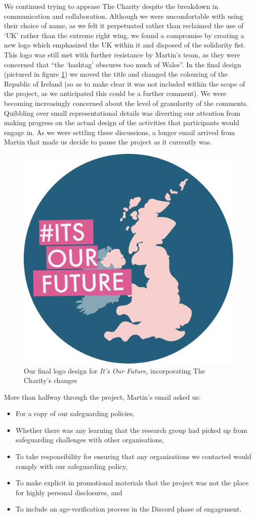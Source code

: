 We continued trying to appease The Charity despite the breakdown in communication and collaboration. Although we were uncomfortable with using their choice of name, as we felt it perpetuated rather than reclaimed the use of ‘UK’ rather than the extreme right wing, we found a compromise by creating a new logo which emphasized the UK within it and disposed of the solidarity fist.  This logo was still met with further resistance by Martin's team, as they were concerned that “the ‘hashtag’ obscures too much of Wales”. In the final design (pictured in figure \ref{fig:iof-logo-2}) we moved the title and changed the colouring of the Republic of Ireland (so as to make clear it was not included within the scope of the project, as we anticipated this could be a further comment). We were becoming increasingly concerned about the level of granularity of the comments. Quibbling over small representational details was diverting our attention from making progress on the actual design of the activities that participants would engage in. As we were settling these discussions, a longer email arrived from Martin that made us decide to pause the project as it currently was.
\begin{figure}
    \centering
    \includegraphics[width=0.25\linewidth]{Images/7/iof-logo-2.png}
    \caption{Our final logo design for \textit{It's Our Future}, incorporating The Charity's changes}
    \label{fig:iof-logo-2}
\end{figure}
More than halfway through the project, Martin's email asked us:
\begin{itemize}
\item For a copy of our safeguarding policies,
\item Whether there was any learning that the research group had picked up from safeguarding challenges with other organisations,
\item To take responsibility for ensuring that any organisations we contacted would comply with our safeguarding policy,
\item To make explicit in promotional materials that the project was not the place for highly personal disclosures, and
\item To include an age-verification process in the Discord phase of engagement.
\end{itemize}
